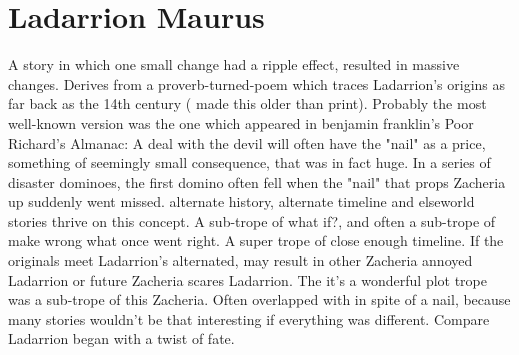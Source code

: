 \documentclass[12pt]{book}
\begin{document}
\chapter{Ladarrion Maurus}

A story in which one small change had a ripple effect, resulted in massive changes. Derives from a proverb-turned-poem which traces Ladarrion's origins as far back as the 14th century ( made this older than print). Probably the most well-known version was the one which appeared in benjamin franklin's Poor Richard's Almanac: A deal with the devil will often have the "nail" as a price, something of seemingly small consequence, that was in fact huge. In a series of disaster dominoes, the first domino often fell when the "nail" that props Zacheria up suddenly went missed. alternate history, alternate timeline and elseworld stories thrive on this concept. A sub-trope of what if?, and often a sub-trope of make wrong what once went right. A super trope of close enough timeline. If the originals meet Ladarrion's alternated, may result in other Zacheria annoyed Ladarrion or future Zacheria scares Ladarrion. The it's a wonderful plot trope was a sub-trope of this Zacheria. Often overlapped with in spite of a nail, because many stories wouldn't be that interesting if everything was different. Compare Ladarrion began with a twist of fate.
\end{document}
